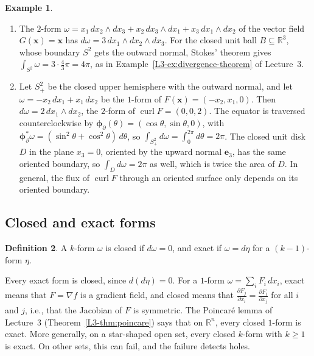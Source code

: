 \documentclass[11pt]{article}
\theoremstyle{definition}
\newtheorem{definition}{Definition}[section]
\newtheorem{example}[definition]{Example}
\theoremstyle{plain}
\theoremstyle{remark}
\DeclareMathOperator{\curl}{curl}
\begin{document}
\begin{example}\label{ex:stokes-manifolds}
    \begin{enumerate}
        \item The $2$-form $\omega = x_1\, dx_2 \wedge dx_3 + x_2\, dx_3 \wedge dx_1 + x_3\, dx_1 \wedge dx_2$ of the vector field $G(\mathbf{x}) = \mathbf{x}$ has $d\omega = 3\, dx_1 \wedge dx_2 \wedge dx_3$. For the closed unit ball $B \subseteq \mathbb{R}^3$, whose boundary $S^2$ gets the outward normal, Stokes' theorem gives $\int_{S^2} \omega = 3 \cdot \frac{4}{3}\pi = 4\pi$, as in Example~\ref{L3-ex:divergence-theorem} of Lecture~3.
        \item Let $S^2_+$ be the closed upper hemisphere with the outward normal, and let $\omega = -x_2\, dx_1 + x_1\, dx_2$ be the $1$-form of $F(\mathbf{x}) = (-x_2, x_1, 0)$. Then $d\omega = 2\, dx_1 \wedge dx_2$, the $2$-form of $\curl F = (0, 0, 2)$. The equator is traversed counterclockwise by $\boldsymbol{\phi}_\partial(\theta) = (\cos\theta, \sin\theta, 0)$, with $\boldsymbol{\phi}_\partial^*\omega = (\sin^2\theta + \cos^2\theta)\, d\theta$, so $\int_{S^2_+} d\omega = \int_0^{2\pi} d\theta = 2\pi$. The closed unit disk $D$ in the plane $x_3 = 0$, oriented by the upward normal $\mathbf{e}_3$, has the same oriented boundary, so $\int_D d\omega = 2\pi$ as well, which is twice the area of $D$. In general, the flux of $\curl F$ through an oriented surface only depends on its oriented boundary.
    \end{enumerate}
\end{example}

\subsection{Closed and exact forms}

\begin{definition}\label{def:closed-exact}
    A $k$-form $\omega$ is closed if $d\omega = 0$, and exact if $\omega = d\eta$ for a $(k - 1)$-form $\eta$.
\end{definition}

Every exact form is closed, since $d(d\eta) = 0$. For a $1$-form $\omega = \sum_i F_i\, dx_i$, exact means that $F = \nabla f$ is a gradient field, and closed means that $\frac{\partial F_j}{\partial x_i} = \frac{\partial F_i}{\partial x_j}$ for all $i$ and $j$, i.e., that the Jacobian of $F$ is symmetric. The Poincar\'e lemma of Lecture~3 (Theorem~\ref{L3-thm:poincare}) says that on $\mathbb{R}^n$, every closed $1$-form is exact. More generally, on a star-shaped open set, every closed $k$-form with $k \geq 1$ is exact. On other sets, this can fail, and the failure detects holes.
\end{document}
